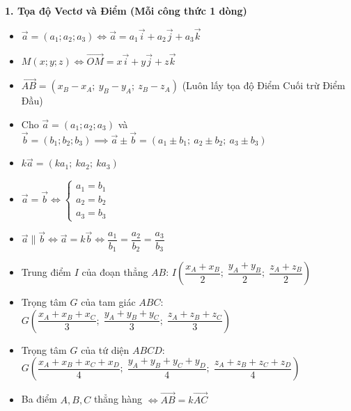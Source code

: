 \documentclass[12pt,a4paper]{article}
\begin{document}

\vspace{-0.2cm}


\begin{theorybox}
    \textbf{\textcolor{deepblue}{\large 1. Tọa độ Vectơ và Điểm (Mỗi công thức 1 dòng)}}
    \begin{itemize}\setlength{\itemsep}{5pt}
        \item $\vec{a} = (a_1; a_2; a_3) \iff \vec{a} = a_1\vec{i} + a_2\vec{j} + a_3\vec{k}$
        \item $M(x; y; z) \iff \vec{OM} = x\vec{i} + y\vec{j} + z\vec{k}$
        \item $\vec{AB} = (x_B - x_A;\ y_B - y_A;\ z_B - z_A)$ (Luôn lấy tọa độ Điểm Cuối trừ Điểm Đầu)
        \item Cho $\vec{a} = (a_1; a_2; a_3)$ và $\vec{b} = (b_1; b_2; b_3) \implies \vec{a} \pm \vec{b} = (a_1 \pm b_1;\ a_2 \pm b_2;\ a_3 \pm b_3)$
        \item $k\vec{a} = (ka_1;\ ka_2;\ ka_3)$
        \item $\vec{a} = \vec{b} \iff \begin{cases} a_1 = b_1 \\ a_2 = b_2 \\ a_3 = b_3 \end{cases}$
        \item $\vec{a} \parallel \vec{b} \iff \vec{a} = k\vec{b} \iff \dfrac{a_1}{b_1} = \dfrac{a_2}{b_2} = \dfrac{a_3}{b_3}$
        \item Trung điểm $I$ của đoạn thẳng $AB$: $I\left(\dfrac{x_A + x_B}{2};\; \dfrac{y_A + y_B}{2};\; \dfrac{z_A + z_B}{2}\right)$
        \item Trọng tâm $G$ của tam giác $ABC$: $G\left(\dfrac{x_A + x_B + x_C}{3};\; \dfrac{y_A + y_B + y_C}{3};\; \dfrac{z_A + z_B + z_C}{3}\right)$
        \item Trọng tâm $G$ của tứ diện $ABCD$: $G\left(\dfrac{x_A + x_B + x_C + x_D}{4};\; \dfrac{y_A + y_B + y_C + y_D}{4};\; \dfrac{z_A + z_B + z_C + z_D}{4}\right)$
        \item Ba điểm $A, B, C$ thẳng hàng $\iff \vec{AB} = k\vec{AC}$
    \end{itemize}


\end{theorybox}
\end{document}
